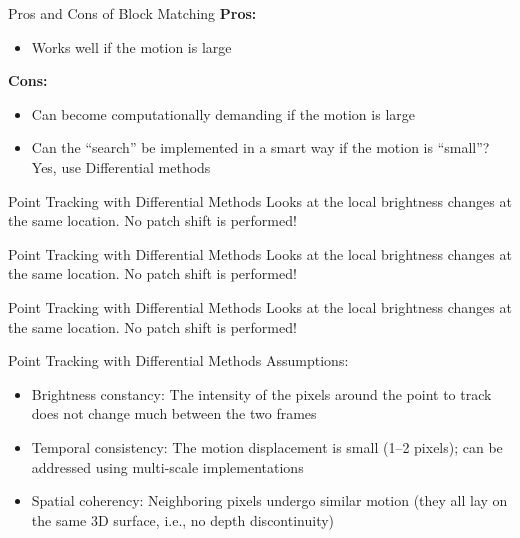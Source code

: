 \begin{frame}{Pros and Cons of Block Matching}
  \textbf{Pros:}
  \begin{itemize}
    \item Works well if the motion is large
  \end{itemize}
  
  \textbf{Cons:}
  \begin{itemize}
    \item Can become computationally demanding if the motion is large
    \item Can the “search” be implemented in a smart way if the motion is “small”?  
      Yes, use Differential methods
  \end{itemize}
\end{frame}

\begin{frame}{Point Tracking with Differential Methods}
  Looks at the local brightness changes at the same location. No patch shift is performed!
  
\end{frame}

\begin{frame}{Point Tracking with Differential Methods}
  Looks at the local brightness changes at the same location. No patch shift is performed!
  
\end{frame}

\begin{frame}{Point Tracking with Differential Methods}
  Looks at the local brightness changes at the same location. No patch shift is performed!
  
\end{frame}

\begin{frame}{Point Tracking with Differential Methods}
  Assumptions:
  \begin{itemize}
    \item Brightness constancy: The intensity of the pixels around the point to track does not change much between the two frames
    \item Temporal consistency: The motion displacement is small (1–2 pixels); can be addressed using multi-scale implementations
    \item Spatial coherency: Neighboring pixels undergo similar motion (they all lay on the same 3D surface, i.e., no depth discontinuity)
  \end{itemize}
\end{frame}


